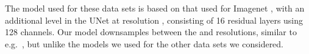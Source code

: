 \documentclass{article}
\begin{document}
The model used for these data sets is based on that used for Imagenet , with an additional level in the UNet at resolution , consisting of 16 residual layers using 128 channels. Our model downsamples between the  and  resolutions, similar to e.g.\ \cite{ho2020denoising}, but unlike the models we used for the other data sets we considered.
\end{document}
